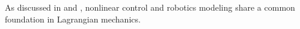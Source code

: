 ﻿%
As discussed in \cite{slotine1991applied} and \cite{lynch2017modern}, nonlinear control
and robotics modeling share a common foundation in Lagrangian mechanics.


